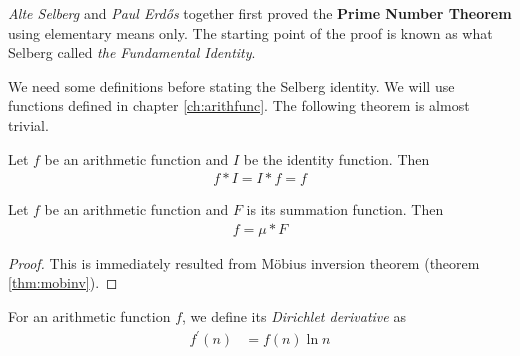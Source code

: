 \documentclass{subfile}
\begin{document}
	\textit{Alte Selberg} and \textit{Paul Erd\H{o}s} together first proved the \textbf{Prime Number Theorem} using elementary means only. The starting point of the proof is known as what Selberg called \textit{the Fundamental Identity}.

	We need some definitions before stating the Selberg identity. We will use functions defined in chapter \eqref{ch:arithfunc}. The following theorem is almost trivial.
	\begin{theorem}
		Let $f$ be an arithmetic function and $I$ be the identity function. Then
			\begin{align*}
				f\ast I=I\ast f=f
			\end{align*}
	\end{theorem}

	\begin{theorem}
		\label{thm:dirichmobi}
		Let $f$ be an arithmetic function and $F$ is its summation function. Then
			\begin{align*}
				f=\mu\ast F
			\end{align*}
	\end{theorem}

	\begin{proof}
		This is immediately resulted from M\" obius inversion theorem (theorem \eqref{thm:mobinv}).
	\end{proof}

	\begin{definition}
		For an arithmetic function $f$, we define its \textit{Dirichlet derivative} as
			\begin{align*}
				f^\prime(n) & =f(n)\ln n
			\end{align*}
	\end{definition}
\end{document}
